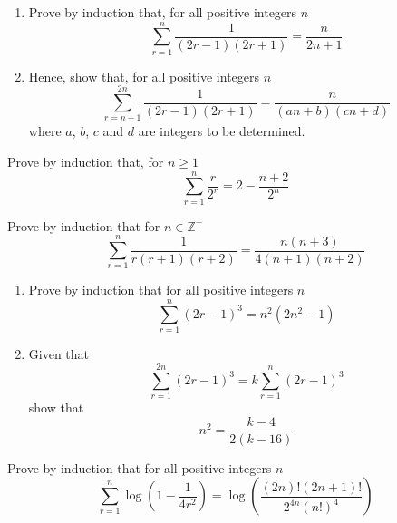 \documentclass[leqno]{article}
\begin{document}
\begin{enumerate}[
  label=\textbf{\arabic*.},
  leftmargin=*,
  topsep=0pt,
  partopsep=0pt,
  parsep=0pt
]
\newpage

\questionitem

\begin{enumerate}[label=\textbf{(\alph*)}]
  \item Prove by induction that, for all positive integers $n$
  \[
  \sum_{r=1}^{n} \frac{1}{(2r-1)(2r+1)}=\frac{n}{2n+1}
  \]
  \item Hence, show that, for all positive integers $n$
  \[
  \sum_{r=n+1}^{2n} \frac{1}{(2r-1)(2r+1)}=\frac{n}{(an+b)(cn+d)}
  \]
  where $a$, $b$, $c$ and $d$ are integers to be determined.  \\
\end{enumerate}

\newpage

\questionitem

Prove by induction that, for $n \ge 1$
\[
\sum_{r=1}^{n} \frac{r}{2^r} = 2 - \frac{n+2}{2^n}
\]

\newpage

\questionitem

Prove by induction that for $n \in \mathbb{Z}^{+}$
\[
\sum_{r=1}^{n} \frac{1}{r(r+1)(r+2)} = \frac{n(n+3)}{4(n+1)(n+2)}
\]

\newpage

\questionitem

\begin{enumerate}[label=\textbf{(\alph*)}]
  \item Prove by induction that for all positive integers $n$
  \[
  \sum_{r=1}^{n} (2r-1)^3 = n^2(2n^2-1)
  \]
  \item Given that
  \[
  \sum_{r=1}^{2n} (2r-1)^3 = k\sum_{r=1}^{n} (2r-1)^3
  \]
  show that
  \[
  n^2 = \frac{k-4}{2(k-16)}
  \]
\end{enumerate}

\newpage

\questionitem

Prove by induction that for all positive integers $n$
\[
\sum_{r=1}^{n} \log\left(1-\frac{1}{4r^2}\right)=\log\left(\frac{(2n)!(2n+1)!}{2^{4n}(n!)^4}\right)
\]


\end{enumerate}
\end{document}
